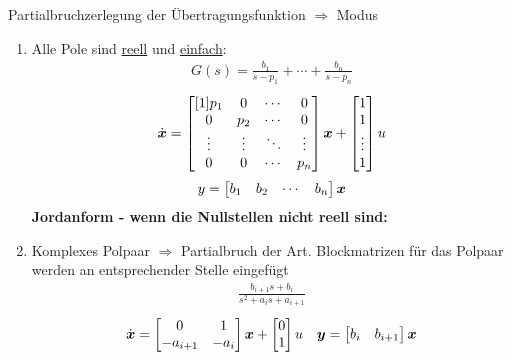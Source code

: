 Partialbruchzerlegung der Übertragungsfunktion $\Rightarrow$ Modus
\\

\begin{enumerate}
    \item Alle Pole sind \underline{reell} und \underline{einfach}:
    \begin{align*}
    G(s) = \frac{b_1}{s-p_1}+ \cdots +\frac{b_n}{s-p_n}
    \end{align*}
    \begin{align*}
    \dot{\boldsymbol{x}} = 
    \begin{bmatrix}[1]
    p_1 & 0 &\cdots & 0 \\
    0&p_2 &\cdots & 0  \\
    \vdots&\vdots&\ddots&\vdots\\
    0&0&\cdots&p_n
    \end{bmatrix}\boldsymbol{x}+ 
    \begin{bmatrix}
    1\\ 1 \\ \vdots \\1
    \end{bmatrix} u     
    \end{align*}
    \begin{align*}
    y= \begin{bmatrix}
    b_1 & b_2&\cdots &b_n
    \end{bmatrix} \boldsymbol{x}
    \end{align*}
    \textbf{Jordanform -  wenn die Nullstellen nicht reell sind:}
    \item Komplexes Polpaar $\Rightarrow$ Partialbruch der Art.
    Blockmatrizen für das Polpaar werden an entsprechender Stelle eingefügt
    \begin{align*}
        \frac{b_{i+1}s+b_i}{s^2+a_is+a_{i+1}}
    \end{align*}
    \begin{align*}
        \dot{\boldsymbol{x}} = \begin{bmatrix}
            0 & 1\\
            -a_{i+1} & -a_i
        \end{bmatrix}\boldsymbol{x} + \begin{bmatrix}
        0\\1
        \end{bmatrix}u & & \boldsymbol{y} = \begin{bmatrix}
        b_i & b_{i+1}
        \end{bmatrix}\boldsymbol{x}
    \end{align*}
    

\end{enumerate}
